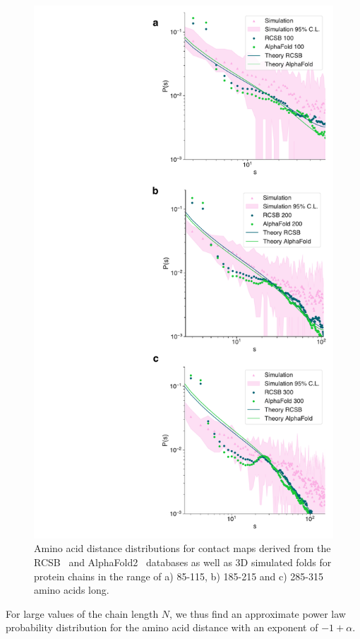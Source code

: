 \documentclass[
reprint,
twocolumn,
amsmath,amssymb,superscriptaddress,aps,
pre]{revtex4-1}
\begin{document}
\begin{figure}
        \centering
	\includegraphics[scale=0.65]{paper/figures/Fig4/Fig4.pdf}
        \caption{Amino acid distance distributions for contact maps derived from the RCSB~\cite{PDB} and AlphaFold2~\cite{} databases as well as 3D simulated folds for protein chains in the range of a) 85-115,  b) 185-215 and c) 285-315 amino acids long.  
        }
        \label{fig:sdd}
\end{figure}
For large values of the chain length $N$, we thus find an approximate power law probability distribution for the amino acid distance with an exponent of $-1+\alpha$. 
\end{document}
